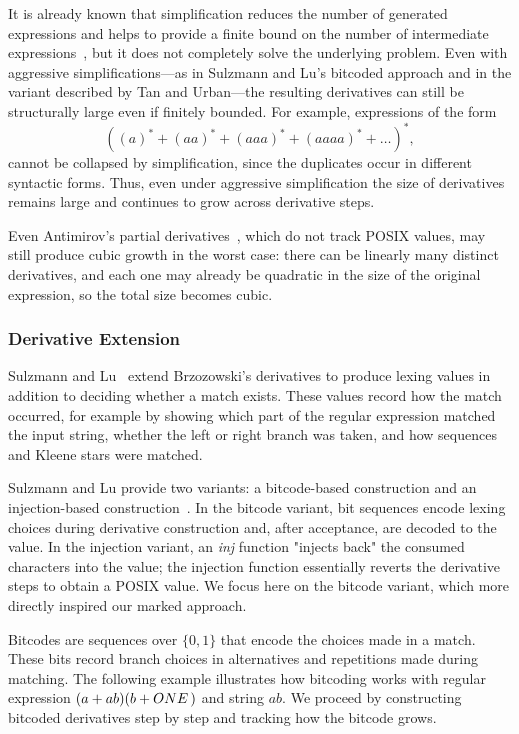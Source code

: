 \documentclass[12pt]{article}
\newcommand{\ONE}{\textbf{1}}
\begin{document}
It is already known that simplification reduces the number of generated
expressions and helps to provide a finite bound on the number of intermediate
expressions~\cite{Sulzmann2014,TanAndUrban2023}, but it does not completely
solve the underlying problem. Even with aggressive simplifications---as in
Sulzmann and Lu’s bitcoded approach and in the variant described by Tan and
Urban---the resulting derivatives can still be structurally large even if
finitely bounded. For example, expressions of the form
\[
((a)^* + (aa)^* + (aaa)^* + (aaaa)^* + \dots )^*,
\]
cannot be collapsed by simplification, since the duplicates occur in different
syntactic forms. Thus, even under aggressive simplification the size of
derivatives remains large and continues to grow across derivative steps.

Even Antimirov’s partial derivatives~\cite{Antimirov1996}, which do not track
POSIX values, may still produce cubic growth in the worst case: there can be
linearly many distinct derivatives, and each one may already be quadratic in
the size of the original expression, so the total size becomes cubic.

\subsubsection{Derivative Extension}

Sulzmann and Lu~\cite{Sulzmann2014} extend Brzozowski’s derivatives to produce 
lexing values in addition to deciding whether a match exists. 
These values record how the match occurred, for example by showing which part
of the regular expression matched the input string, whether the left or right
branch was taken, and how sequences and Kleene stars were matched.


Sulzmann and Lu provide two variants: a bitcode-based construction and an
injection-based construction~\cite{Sulzmann2014}.  
In the bitcode variant, bit sequences encode lexing choices during derivative
construction and, after acceptance, are decoded to the value. In the injection
variant, an \textit{inj} function "injects back" the consumed characters into
the value; the injection function essentially reverts the derivative steps to
obtain a POSIX value. We focus here on the bitcode variant, which more directly
inspired our marked approach.

Bitcodes are sequences over $\{0,1\}$ that encode the choices made in a match.  
These bits record branch choices in alternatives and repetitions made during matching. 
The following example illustrates how bitcoding works with regular expression $(a+ab)(b+\\ONE\,)$ and string $ab$.  
We proceed by constructing bitcoded derivatives step by step and tracking how the bitcode grows.
\end{document}
